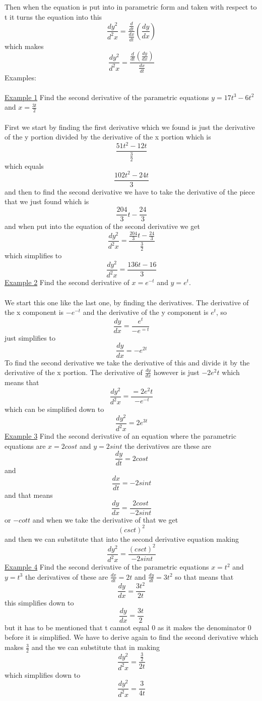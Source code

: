 \documentclass[a4paper,openright, 14pt]{article}
\begin{document}
Then when the equation is put into in parametric form and taken with respect to t it turns the equation into this  $$\frac{dy^2}{d^2x}=\frac{\frac{d}{dt}}{\frac{dx}{dt}}({\frac{dy}{dx}})$$ which makes 
 $$\frac{dy^2}{d^2x}=\frac{\frac{d}{dt}(\frac{dy}{dx})}{\frac{dx}{dt}}$$
 Examples:\\\\
 \underline{Example 1} Find the second derivative of the parametric equations $y=17t^3-6t^2$ and $x=\frac{3t}{2}$\\\\
 First we start by finding the first derivative which we found is just the derivative of the y portion divided by the derivative of the x portion which is $$\frac{51t^2-12t}{\frac{3}{2}}$$ which equals $$\frac{102t^2-24t}{3}$$ and then to find the second derivative we have to take the derivative of the piece that we just found which is $$\frac{204}{3}t-\frac{24}{3}$$ and when put into the equation of the second derivative we get $$\frac{dy^2}{d^2x}=\frac{\frac{204}{3}t-\frac{24}{3}}{\frac{3}{2}}$$ which simplifies to $$\frac{dy^2}{d^2x}=\frac{136t-16}{3}$$
 \underline{Example 2}
 Find the second derivative of $x=e^{-t}$ and $y=e^t$.
\\\\We start this one like the last one, by finding the derivatives. The derivative of the x component is $-e^{-t}$ and the derivative of the y component is $e^t$, so $$\frac{dy}{dx}=\frac{e^t}{-e^{=t}}$$ just simplifies to $$\frac{dy}{dx}=-e^{2t}$$
To find the second derivative we take the derivative of this and divide it by the derivative of the x portion. The derivative of $\frac{dy}{dx}$ however is just $-2e^2t$ which means that $$\frac{dy^2}{d^2x}=\frac{=2e^2t}{-e^{-t}}$$ which can be simplified down to $$\frac{dy^2}{d^2x}=2e^{3t}$$
\underline{Example 3} Find the second derivative of an equation where the parametric equations are $x=2cost$ and $y=2sint$ the derivatives are these are $$\frac{dy}{dt}=2cost$$ and $$\frac{dx}{dt}=-2sint$$ and that means $$\frac{dy}{dx}=\frac{2cost}{-2sint}$$ or $-cott$ and when we take the derivative of that we get $$(csct)^2$$ and then we can substitute that into the second derivative equation making $$\frac{dy^2}{d^2x}=\frac{(csct)^2}{-2sint}$$
\underline{Example 4}
Find the second derivative of the parametric equations $x=t^2$ and $y=t^3$ the derivatives of these are $\frac{dx}{dt}=2t$ and $\frac{dy}{dt}=3t^2$ so that means that $$\frac{dy}{dx}=\frac{3t^2}{2t}$$ this simplifies down to $$\frac{dy}{dx}=\frac{3t}{2}$$ but it has to be mentioned that t cannot equal 0 as it makes the denominator 0 before it is simplified.
We have to derive again to find the second derivative which makes $\frac{3}{2}$ and the we can substitute that in making $$\frac{dy^2}{d^2x}=\frac{\frac{3}{2}}{2t}$$ which simplifies down to $$\frac{dy^2}{d^2x}=\frac{3}{4t}$$
\end{document}
